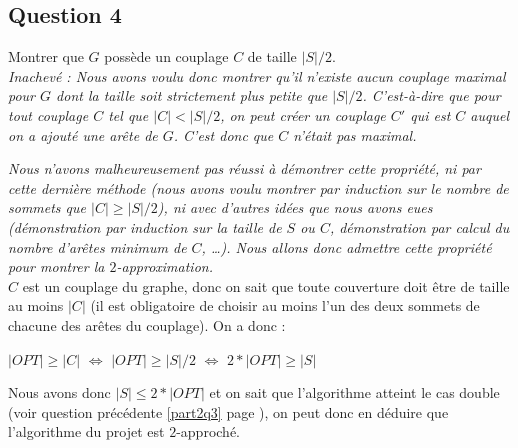   \subsection{Question 4}
  Montrer que $G$ possède un couplage $C$ de taille $|S|/2$.\\
  
  \emph{Inachevé : Nous avons voulu donc montrer qu'il n'existe aucun
  couplage maximal pour $G$ dont la taille soit strictement plus petite
  que $|S|/2$. C'est-à-dire que pour tout couplage $C$ tel que $|C| <
  |S|/2$, on peut créer un couplage $C'$ qui est $C$ auquel on a ajouté
  une arête de $G$. C'est donc que $C$ n'était pas maximal.}

  \emph{Nous n'avons malheureusement pas réussi à démontrer cette
  propriété, ni par cette dernière méthode (nous avons voulu montrer par
  induction sur le nombre de sommets que $|C| \geq |S|/2$), ni avec
  d'autres idées que nous avons eues (démonstration par induction sur la
  taille de $S$ ou $C$, démonstration par calcul du nombre d'arêtes
  minimum de $C$, \dots). Nous allons donc admettre cette propriété pour
  montrer la $2$-approximation.}\\

  $C$ est un couplage du graphe, donc on sait que toute couverture doit
  être de taille au moins $|C|$ (il est obligatoire de choisir au moins
  l'un des deux sommets de chacune des arêtes du couplage). On a donc :
  \begin{center}
   $|OPT| \geq |C|$ $\iff$ $|OPT| \geq |S|/2$ $\iff$ $2 * |OPT| \geq
   |S|$
  \end{center}

  Nous avons donc $|S| \leq 2 * |OPT|$ et on sait que l'algorithme
  atteint le cas double (voir question précédente \ref{part2q3} page
  \pageref{part2q3}), on peut donc en déduire que l'algorithme du projet
  est $2$-approché.
  